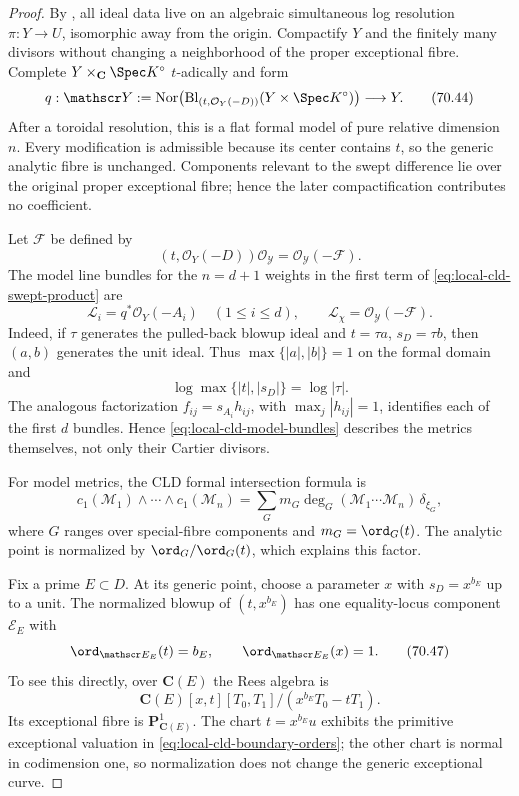 \begin{proof}
By , all ideal data live on an algebraic
simultaneous log resolution \(\pi:Y\to U\), isomorphic away from the origin.
Compactify \(Y\) and the finitely many divisors without changing a
neighborhood of the proper exceptional fibre. Complete
\(Y\times_{\mathbf C}\Spec K^\circ\) \(t\)-adically and form
\[
 q:\mathscr Y:=
 \operatorname{Nor}\!\left(
   \operatorname{Bl}_{(t,\mathcal O_Y(-D))}(Y\times\Spec K^\circ)
 \right)\longrightarrow Y.
\tag{70.44}\label{eq:local-cld-formal-blowup}
\]
After a toroidal resolution, this is a flat formal model of pure relative
dimension \(n\). Every modification is admissible because its center
contains \(t\), so the generic analytic fibre is unchanged. Components
relevant to the swept difference lie over the original proper exceptional
fibre; hence the later compactification contributes no coefficient.

Let \(\mathscr F\) be defined by
\[
 (t,\mathcal O_Y(-D))\mathcal O_{\mathscr Y}
      =\mathcal O_{\mathscr Y}(-\mathscr F).
\]
The model line bundles for the \(n=d+1\) weights in the first term of
\eqref{eq:local-cld-swept-product} are
\[
 \mathcal L_i=q^*\mathcal O_Y(-A_i)\quad(1\leq i\leq d),
 \qquad
 \mathcal L_\chi=\mathcal O_{\mathscr Y}(-\mathscr F).
\tag{70.45}\label{eq:local-cld-model-bundles}
\]
Indeed, if \(\tau\) generates the pulled-back blowup ideal and
\(t=\tau a\), \(s_D=\tau b\), then \((a,b)\) generates the unit ideal.
Thus \(\max\{|a|,|b|\}=1\) on the formal domain and
\[
                \log\max\{|t|,|s_D|\}=\log|\tau|.
\]
The analogous factorization \(f_{ij}=s_{A_i}h_{ij}\), with
\(\max_j|h_{ij}|=1\), identifies each of the first \(d\) bundles. Hence
\eqref{eq:local-cld-model-bundles} describes the metrics themselves, not
only their Cartier divisors.

For model metrics, the CLD formal intersection formula
\cite[Theorem~18.5.5 and Proposition~18.5.8]{CLD25} is
\[
 c_1(\mathcal M_1)\wedge\cdots\wedge c_1(\mathcal M_n)
 =\sum_Gm_G\deg_G(\mathcal M_1\cdots\mathcal M_n)\,\delta_{\xi_G},
\tag{70.46}\label{eq:local-cld-formal-measure}
\]
where \(G\) ranges over special-fibre components and
\(m_G=\ord_G(t)\). The analytic point is normalized by
\(\ord_G/\ord_G(t)\), which explains this factor.

Fix a prime \(E\subset D\). At its generic point, choose a parameter \(x\)
with \(s_D=x^{b_E}\) up to a unit. The normalized blowup of
\((t,x^{b_E})\) has one equality-locus component \(\mathscr E_E\) with
\[
             \ord_{\mathscr E_E}(t)=b_E,
 \qquad
             \ord_{\mathscr E_E}(x)=1.
\tag{70.47}\label{eq:local-cld-boundary-orders}
\]
To see this directly, over \(\mathbf C(E)\) the Rees algebra is
\[
 \mathbf C(E)[x,t][T_0,T_1]/(x^{b_E}T_0-tT_1).
\]
Its exceptional fibre is \(\mathbf P^1_{\mathbf C(E)}\). The chart
\(t=x^{b_E}u\) exhibits the primitive exceptional valuation in
\eqref{eq:local-cld-boundary-orders}; the other chart is normal in
codimension one, so normalization does not change the generic exceptional
curve.


\end{proof}
